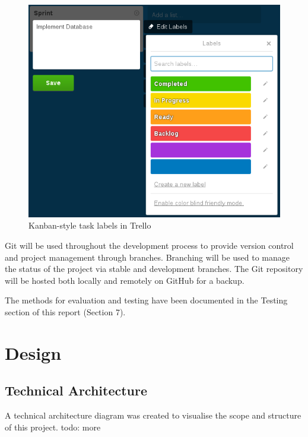 \documentclass[a4paper, 12pt]{article}
\begin{document}
\begin{figure}[h]
	\centering
	\includegraphics[scale=0.7]{kanban}
	\caption{Kanban-style task labels in Trello}
	\label{fig:kanban}
\end{figure}

Git will be used throughout the development process to provide version control and project management through branches. Branching will be used to manage the status of the project via stable and development branches. The Git repository will be hosted both locally and remotely on GitHub for a backup.

The methods for evaluation and testing have been documented in the Testing section of this report (Section 7).

\section{Design}
\subsection{Technical Architecture}
A technical architecture diagram was created to visualise the scope and structure of this project. todo: more
\end{document}
